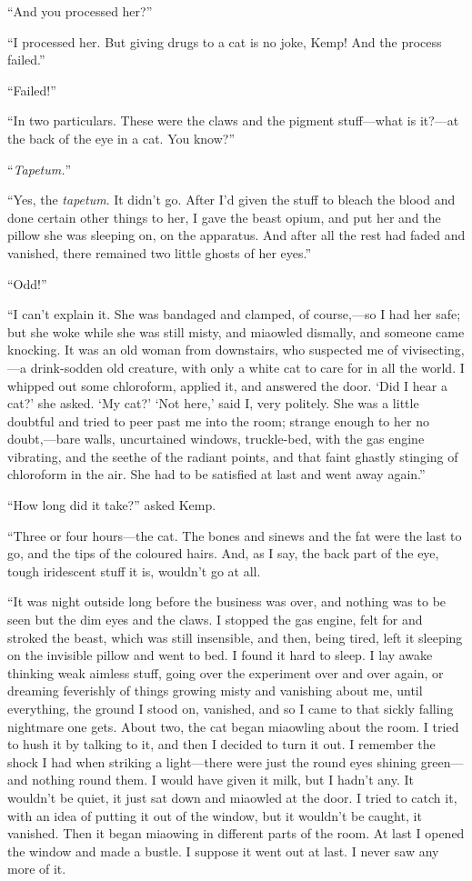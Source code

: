 “And you processed her?”

“I processed her. But giving drugs to a cat is no joke, Kemp! And the process failed.”

“Failed!”

“In two particulars. These were the claws and the pigment stuff—what is it?—at the back of the eye in a cat. You know?”

“\emph{Tapetum.}”

“Yes, the \emph{tapetum}. It didn’t go. After I’d given the stuff to bleach the blood and done certain other things to her, I gave the beast opium, and put her and the pillow she was sleeping on, on the apparatus. And after all the rest had faded and vanished, there remained two little ghosts of her eyes.”

“Odd!”

“I can’t explain it. She was bandaged and clamped, of course,—so I had her safe; but she woke while she was still misty, and miaowled dismally, and someone came knocking. It was an old woman from downstairs, who suspected me of vivisecting,—a drink-sodden old creature, with only a white cat to care for in all the world. I whipped out some chloroform, applied it, and answered the door. ‘Did I hear a cat?’ she asked. ‘My cat?’ ‘Not here,’ said I, very politely. She was a little doubtful and tried to peer past me into the room; strange enough to her no doubt,—bare walls, uncurtained windows, truckle-bed, with the gas engine vibrating, and the seethe of the radiant points, and that faint ghastly stinging of chloroform in the air. She had to be satisfied at last and went away again.”

“How long did it take?” asked Kemp.

“Three or four hours—the cat. The bones and sinews and the fat were the last to go, and the tips of the coloured hairs. And, as I say, the back part of the eye, tough iridescent stuff it is, wouldn’t go at all.

“It was night outside long before the business was over, and nothing was to be seen but the dim eyes and the claws. I stopped the gas engine, felt for and stroked the beast, which was still insensible, and then, being tired, left it sleeping on the invisible pillow and went to bed. I found it hard to sleep. I lay awake thinking weak aimless stuff, going over the experiment over and over again, or dreaming feverishly of things growing misty and vanishing about me, until everything, the ground I stood on, vanished, and so I came to that sickly falling nightmare one gets. About two, the cat began miaowling about the room. I tried to hush it by talking to it, and then I decided to turn it out. I remember the shock I had when striking a light—there were just the round eyes shining green—and nothing round them. I would have given it milk, but I hadn’t any. It wouldn’t be quiet, it just sat down and miaowled at the door. I tried to catch it, with an idea of putting it out of the window, but it wouldn’t be caught, it vanished. Then it began miaowing in different parts of the room. At last I opened the window and made a bustle. I suppose it went out at last. I never saw any more of it.

